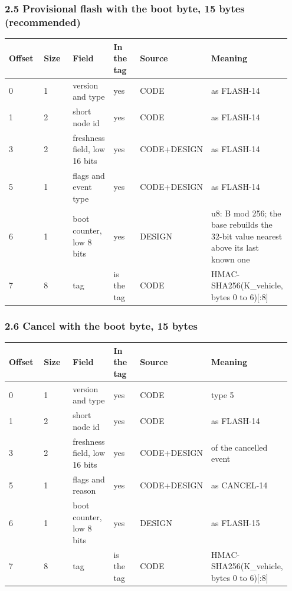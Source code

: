 \subsubsection*{2.5 Provisional flash with the boot byte, 15 bytes (recommended)}

{\scriptsize\raggedright
\begin{longtable}{p{0.158\linewidth}p{0.158\linewidth}p{0.158\linewidth}p{0.158\linewidth}p{0.158\linewidth}p{0.158\linewidth}}
\toprule
Offset & Size & Field & In the tag & Source & Meaning \\
\midrule
\endhead
0 & 1 & version and type & yes & CODE & as FLASH-14 \\
1 & 2 & short node id & yes & CODE & as FLASH-14 \\
3 & 2 & freshness field, low 16 bits & yes & CODE+DESIGN & as FLASH-14 \\
5 & 1 & flags and event type & yes & CODE+DESIGN & as FLASH-14 \\
6 & 1 & boot counter, low 8 bits & yes & DESIGN & u8: B mod 256; the base rebuilds the 32-bit value nearest above its last known one \\
7 & 8 & tag & is the tag & CODE & HMAC-SHA256(K\_vehicle, bytes 0 to 6)[:8] \\
\bottomrule
\end{longtable}}

\subsubsection*{2.6 Cancel with the boot byte, 15 bytes}

{\scriptsize\raggedright
\begin{longtable}{p{0.158\linewidth}p{0.158\linewidth}p{0.158\linewidth}p{0.158\linewidth}p{0.158\linewidth}p{0.158\linewidth}}
\toprule
Offset & Size & Field & In the tag & Source & Meaning \\
\midrule
\endhead
0 & 1 & version and type & yes & CODE & type 5 \\
1 & 2 & short node id & yes & CODE & as FLASH-14 \\
3 & 2 & freshness field, low 16 bits & yes & CODE+DESIGN & of the cancelled event \\
5 & 1 & flags and reason & yes & CODE+DESIGN & as CANCEL-14 \\
6 & 1 & boot counter, low 8 bits & yes & DESIGN & as FLASH-15 \\
7 & 8 & tag & is the tag & CODE & HMAC-SHA256(K\_vehicle, bytes 0 to 6)[:8] \\
\bottomrule
\end{longtable}}

